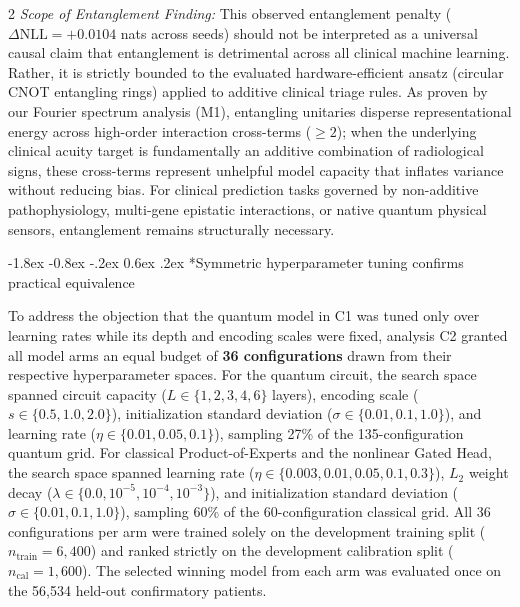 \documentclass[10pt,a4paper,twoside]{article}
\makeatletter
\renewcommand{\subsection}{\@startsection{subsection}{2}{\z@}%
  {-1.8ex \@plus -0.8ex \@minus -.2ex}%
  {0.6ex \@plus.2ex}%
  {\normalfont\normalsize\sffamily\bfseries\color{naturedark}}}
\makeatother
\begin{document}
\begin{multicols}{2}
\noindent\textit{Scope of Entanglement Finding:} This observed entanglement penalty ($\Delta\text{NLL} = +0.0104$ nats across seeds) should not be interpreted as a universal causal claim that entanglement is detrimental across all clinical machine learning. Rather, it is strictly bounded to the evaluated hardware-efficient ansatz (circular CNOT entangling rings) applied to additive clinical triage rules. As proven by our Fourier spectrum analysis (M1), entangling unitaries disperse representational energy across high-order interaction cross-terms ($\ge 2$); when the underlying clinical acuity target is fundamentally an additive combination of radiological signs, these cross-terms represent unhelpful model capacity that inflates variance without reducing bias. For clinical prediction tasks governed by non-additive pathophysiology, multi-gene epistatic interactions, or native quantum physical sensors, entanglement remains structurally necessary.

\subsection*{Symmetric hyperparameter tuning confirms practical equivalence}

To address the objection that the quantum model in C1 was tuned only over learning rates while its depth and encoding scales were fixed, analysis C2 granted all model arms an equal budget of \textbf{36 configurations} drawn from their respective hyperparameter spaces. For the quantum circuit, the search space spanned circuit capacity ($L \in \{1, 2, 3, 4, 6\}$ layers), encoding scale ($s \in \{0.5, 1.0, 2.0\}$), initialization standard deviation ($\sigma \in \{0.01, 0.1, 1.0\}$), and learning rate ($\eta \in \{0.01, 0.05, 0.1\}$), sampling 27\% of the 135-configuration quantum grid. For classical Product-of-Experts and the nonlinear Gated Head, the search space spanned learning rate ($\eta \in \{0.003, 0.01, 0.05, 0.1, 0.3\}$), $L_2$ weight decay ($\lambda \in \{0.0, 10^{-5}, 10^{-4}, 10^{-3}\}$), and initialization standard deviation ($\sigma \in \{0.01, 0.1, 1.0\}$), sampling 60\% of the 60-configuration classical grid. All 36 configurations per arm were trained solely on the development training split ($n_{\text{train}}=6,400$) and ranked strictly on the development calibration split ($n_{\text{cal}}=1,600$). The selected winning model from each arm was evaluated once on the 56,534 held-out confirmatory patients.


\end{multicols}
\end{document}
